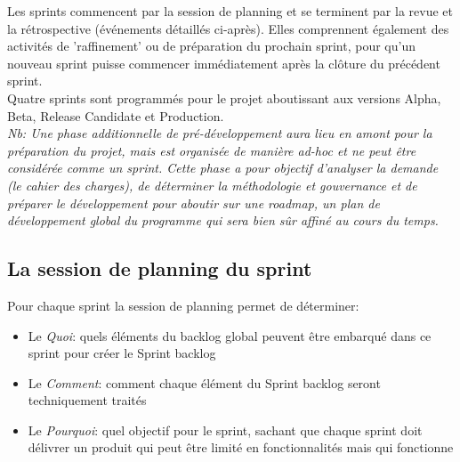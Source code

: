 Les sprints commencent par la session de planning et se terminent par la revue et la rétrospective (événements détaillés ci-après). Elles comprennent également des activités de 'raffinement' ou de préparation du prochain sprint,
 pour qu’un nouveau sprint puisse commencer immédiatement après la clôture du précédent sprint.\\

Quatre sprints sont programmés pour le projet aboutissant aux versions Alpha, Beta, Release Candidate et 
Production.\\

\emph{Nb: Une phase additionnelle de pré-développement aura lieu en amont pour la préparation du projet,
 mais est organisée de manière ad-hoc et ne peut être considérée comme un sprint. 
 Cette phase a pour objectif d’analyser la demande (le cahier des charges), de déterminer la méthodologie
 et gouvernance et de préparer le développement pour aboutir sur une roadmap, un plan de développement 
 global du programme qui sera bien sûr affiné au cours du temps.
}

\subsection{La session de planning du sprint}

Pour chaque sprint la session de planning permet de déterminer:

\begin{itemize}
    \item Le \emph{Quoi}: quels éléments du backlog global peuvent être embarqué dans ce sprint pour créer le Sprint backlog
    \item Le \emph{Comment}: comment chaque élément du Sprint backlog seront techniquement traités
    \item Le \emph{Pourquoi}: quel objectif pour le sprint, sachant que chaque sprint doit délivrer un produit qui peut être limité en fonctionnalités mais qui fonctionne
\end{itemize}

